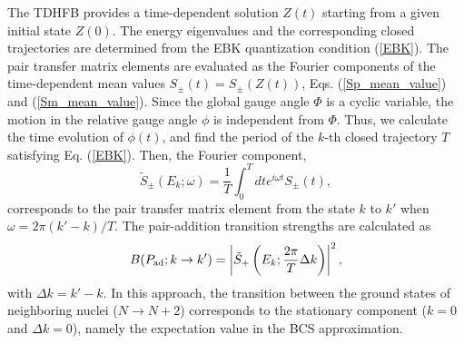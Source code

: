 \documentclass[%
superscriptaddress,
preprint,
showpacs,
nofootinbib,
amsmath,amssymb,
prc,
floatfix ]%
{revtex4-1}
\begin{document}
The TDHFB provides a time-dependent solution $Z(t)$ starting from
a given initial state $Z(0)$.
The energy eigenvalues and the corresponding closed trajectories
are determined from the EBK quantization condition (\ref{EBK}).
The pair transfer matrix elements are evaluated as the Fourier components
of the time-dependent mean values $S_\pm(t)=S_\pm(Z(t))$,
Eqs. (\ref{Sp_mean_value}) and (\ref{Sm_mean_value}).
Since the global gauge angle $\Phi$ is a cyclic variable,
the motion in the relative gauge angle $\phi$ is independent from $\Phi$.
Thus, we calculate the time evolution of $\phi(t)$, and
find the period of the $k$-th closed trajectory $T$
satisfying Eq. (\ref{EBK}).
Then, the Fourier component,
\begin{equation}
	\tilde{S}_\pm(E_k; \omega) = \frac{1}{T}\int_0^T dt
	e^{i\omega t} S_\pm(t) ,
\label{Fourier_decomposition}
\end{equation}
corresponds to the pair transfer matrix element from the state $k$ to $k'$
when $\omega=2\pi (k'-k)/T$.
The pair-addition transition strengths are calculated as
\begin{equation}
	B(P_{\rm ad};k\rightarrow k') 
	= \left|\tilde{S}_+\left(E_k;\frac{2\pi}{T}\Delta k \right) \right|^2 ,
\end{equation}
with $\Delta k=k'-k$.
In this approach, the transition between the ground states of
neighboring nuclei ($N\rightarrow N+2$) corresponds to
the stationary component ($k=0$ and $\Delta k=0$),
namely the expectation value in the BCS approximation.
\end{document}
